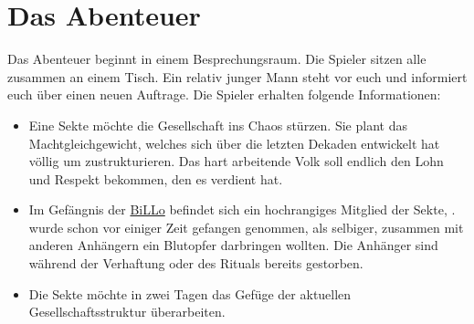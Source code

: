 \section{Das Abenteuer}
    Das Abenteuer beginnt in einem Besprechungsraum. Die Spieler sitzen alle zusammen an einem Tisch. Ein relativ junger Mann steht vor euch und informiert euch über einen neuen Auftrage. Die Spieler erhalten folgende Informationen:
    \begin{itemize}
        \item Eine Sekte möchte die Gesellschaft ins Chaos stürzen. Sie plant das Machtgleichgewicht, welches sich über die letzten Dekaden entwickelt hat völlig um zustrukturieren. Das hart arbeitende Volk soll endlich den Lohn und Respekt bekommen, den es verdient hat.
        \item Im Gefängnis der \hyperref[subsubsec:billo]{BiLLo} befindet sich ein hochrangiges Mitglied der Sekte, .  wurde schon vor einiger Zeit gefangen genommen, als selbiger, zusammen mit anderen Anhängern ein Blutopfer darbringen wollten. Die Anhänger sind während der Verhaftung oder des Rituals bereits gestorben.
        \item Die Sekte möchte in zwei Tagen das Gefüge der aktuellen Gesellschaftsstruktur überarbeiten.
    \end{itemize}
